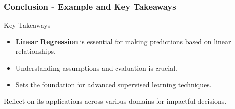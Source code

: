\documentclass[aspectratio=169]{beamer}
\begin{document}
\begin{frame}[fragile]
    \frametitle{Conclusion - Example and Key Takeaways}

    \begin{block}{Key Takeaways}
        \begin{itemize}
            \item \textbf{Linear Regression} is essential for making predictions based on linear relationships.
            \item Understanding assumptions and evaluation is crucial.
            \item Sets the foundation for advanced supervised learning techniques.
        \end{itemize}
        Reflect on its applications across various domains for impactful decisions.
    \end{block}
\end{frame}
\end{document}
